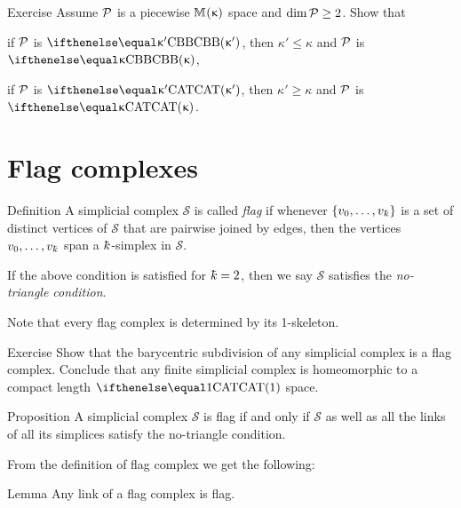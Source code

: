 \begin{thm}{Exercise}\label{ex:polyKk}
Assume $\mathcal{P}$ is a piecewise
$\mathbb{M}_{{}}^{}({\upkappa})$ space and $\dim \spc{P}\ge 2$. 
Show that 

\begin{subthm}{} if $\mathcal{P}$ is $\Alex{\kappa'}$, then $\kappa'\le \kappa$ and $\mathcal{P}$ is $\Alex{\kappa}$, 
\end{subthm}

\begin{subthm}{}
if $\mathcal{P}$ is $\CAT{\kappa'}$, then $\kappa'\ge \kappa$ and $\mathcal{P}$ is $\CAT\kappa$.
\end{subthm}

\end{thm}

\section{Flag complexes}


\begin{thm}{Definition}
A simplicial complex $\mathcal{S}$ 
is called \emph{flag} if whenever $\{v_0,\z\dots,v_\kay\}$
is a set of distinct vertices of $\mathcal{S}$
that are pairwise joined by edges, then the vertices $v_0,\dots,v_\kay$
span a $\kay$-simplex in $\mathcal{S}$.

If the above condition is satisfied for $\kay=2$, 
then we say $\mathcal{S}$ satisfies 
the \emph{no-triangle condition}.
\end{thm}

Note that every flag complex is determined by its 1-skeleton.

\begin{thm}{Exercise}\label{ex:barycenric-flag}
Show that the barycentric subdivision of any simplicial complex is a flag complex.
Conclude that any finite  simplicial complex is homeomorphic to a compact length $\CAT1$ space.
\end{thm}


\begin{thm}{Proposition}\label{prop:no-trig}
A simplicial complex $\mathcal{S}$ is flag if and only if 
$\mathcal{S}$ as well as all the links of all its simplices
satisfy the no-triangle condition.
\end{thm}

From the definition of flag complex 
we get the following:

\begin{thm}{Lemma}\label{lem:link-of-flag}
Any link of a flag complex is flag.
\end{thm}


